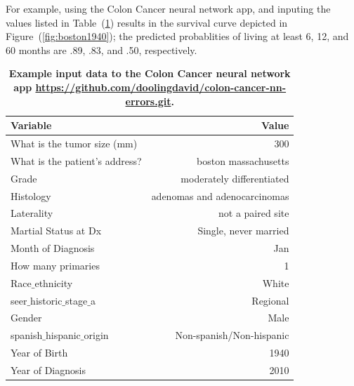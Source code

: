 \documentclass[10pt,letterpaper]{article}
\begin{document}
 For example, using the Colon Cancer neural network app, and 
inputing the values listed in Table~(\ref{tab:boston1940}) results in the survival curve depicted in Figure~(\ref{fig:boston1940}); the predicted probablities of living 
at least 6, 12, and 60 months are .89, .83, and .50, respectively.



\begin{table}[!ht]
\begin{adjustwidth}{-2.25in}{0in} %
\caption{\bf{Example input data to the Colon Cancer neural network app \url{https://github.com/doolingdavid/colon-cancer-nn-errors.git}.}}
\begin{tabular}{lr}
\toprule
  Variable  & Value \\ 
\midrule
  What is the tumor size (mm) & 300 \\  
  What is the patient's address? & boston massachusetts \\ 
  Grade & moderately differentiated \\  
  Histology & adenomas and adenocarcinomas \\ 
  Laterality & not a paired site \\  
 Martial Status at Dx & Single, never married \\  
 Month of Diagnosis & Jan \\  
 How many primaries & 1 \\  
  Race$\_$ethnicity & White \\  
  seer$\_$historic$\_$stage$\_$a  & Regional \\ 
  Gender & Male \\  
  spanish$\_$hispanic$\_$origin & Non-spanish/Non-hispanic \\ 
 Year of Birth & 1940 \\  
  Year of Diagnosis & 2010 \\
\bottomrule
\end{tabular}
\label{tab:boston1940}
\end{adjustwidth}
\end{table}
\end{document}
